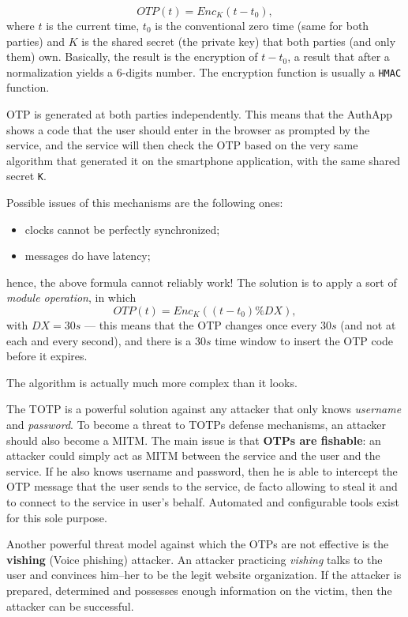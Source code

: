 \documentclass[10pt]{\classname}
\begin{document}
$$ OTP(t) = Enc_K(t - t_0), $$ where $t$ is the current time, $t_0$ is the
conventional zero time (same for both parties) and $K$ is the shared secret
(the private key) that both parties (and only them) own. Basically, the result
is the encryption of $t - t_0$, a result that after a normalization yields a
$6$-digits number. The encryption function is usually a \texttt{HMAC} function.

OTP is generated at both parties independently. This means that the AuthApp
shows a code that the user should enter in the browser as prompted by the
service, and the service will then check the OTP based on the very same
algorithm that generated it on the smartphone application, with the same shared
secret \texttt{K}.

Possible issues of this mechanisms are the following ones:
\begin{itemize}
    \item clocks cannot be perfectly synchronized;
    \item messages do have latency;
\end{itemize}

hence, the above formula cannot reliably work! The solution is to apply a sort
of \emph{module operation}, in which 
$$ OTP(t) = Enc_K((t - t_0) \% DX), $$  with $DX = 30s$ --- this means that the OTP
changes once every $30s$ (and not at each and every second), and there is a
$30s$ time window to insert the OTP code before it expires.

The algorithm is actually much more complex than it looks.

The TOTP is a powerful solution against any attacker that only knows
\emph{username} and \emph{password}. To become a threat to TOTPs defense
mechanisms, an attacker should also become a MITM. The main issue is that
\textbf{OTPs are fishable}: an attacker could simply act as MITM between the
service and the user and the service. If he also knows username and password,
then he is able to intercept the OTP message that the user sends to the
service, de facto allowing to steal it and to connect to the service in user's
behalf. Automated and configurable tools exist for this sole purpose.

Another powerful threat model against which the OTPs are not effective is the
\textbf{vishing} (Voice phishing) attacker. An attacker practicing
\emph{vishing} talks to the user and convinces him\---her to be the legit
website organization. If the attacker is prepared, determined and possesses
enough information on the victim, then the attacker can be successful.
\end{document}
